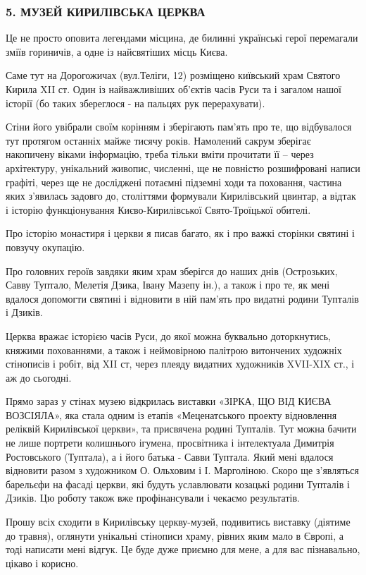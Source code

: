  
 
 
 
 
\subsubsection{5. МУЗЕЙ КИРИЛІВСЬКА ЦЕРКВА}

Це не просто оповита легендами місцина, де билинні українські герої перемагали
зміїв гориничів, а одне із найсвятіших місць Києва.

Саме тут на Дорогожичах (вул.Теліги, 12) розміщено київський храм Святого
Кирила XII ст.  Один із найважливіших об’єктів часів Руси та і загалом нашої
історії (бо таких збереглося - на пальцях рук перерахувати).

Стіни його увібрали своїм корінням і зберігають пам’ять про те, що відбувалося
тут протягом останніх майже тисячу років. Намолений сакрум зберігає накопичену
віками інформацію, треба тільки вміти прочитати її – через архітектуру,
унікальний живопис, численні, ще не повністю розшифровані написи графіті, через
ще не досліджені потаємні підземні ходи та поховання, частина яких з'явилась
задовго до, століттями формували Кирилівський цвинтар, а відтак і історію
функціонування Києво-Кирилівської Свято-Троїцької обителі.

Про історію монастиря і церкви я писав багато, як і про важкі сторінки святині
і повзучу окупацію.

Про головних героїв завдяки яким храм зберігся до наших днів (Острозьких, Савву
Туптало, Мелетія Дзика, Івану Мазепу ін.), а також і про те, як мені вдалося
допомогти святині і відновити в ній пам’ять про видатні родини Тупталів і
Дзиків.

Церква вражає історією часів Руси, до якої можна буквально доторкнутись,
княжими похованнями, а також і неймовірною палітрою витончених художніх
стінописів і робіт, від XII ст, через плеяду видатних художників XVII-XIX ст.,
і аж до сьогодні.

Прямо зараз у стінах музею відкрилась виставки «ЗІРКА, ЩО ВІД КИЄВА ВОЗСІЯЛА»,
яка стала одним із етапів «Меценатського проекту відновлення реліквій
Кирилівської церкви», та присвячена родині Тупталів. Тут можна бачити не лише
портрети колишнього ігумена, просвітника і інтелектуала Димитрія Ростовського
(Туптала), а і його батька - Савви Туптала. Який мені вдалося відновити разом з
художником О. Ольховим і І. Марголіною. Скоро ще з’являться барельєфи на фасаді
церкви, які будуть уславлювати козацькі родини Тупталів і Дзиків. Цю роботу
також вже профінансували і чекаємо результатів.

Прошу всіх сходити в Кирилівську церкву-музей, подивитись виставку (діятиме до
травня), оглянути унікальні стінописи храму, рівних яким мало в Європі, а тоді
написати мені відгук. Це буде дуже приємно для мене, а для вас пізнавально,
цікаво і корисно.
